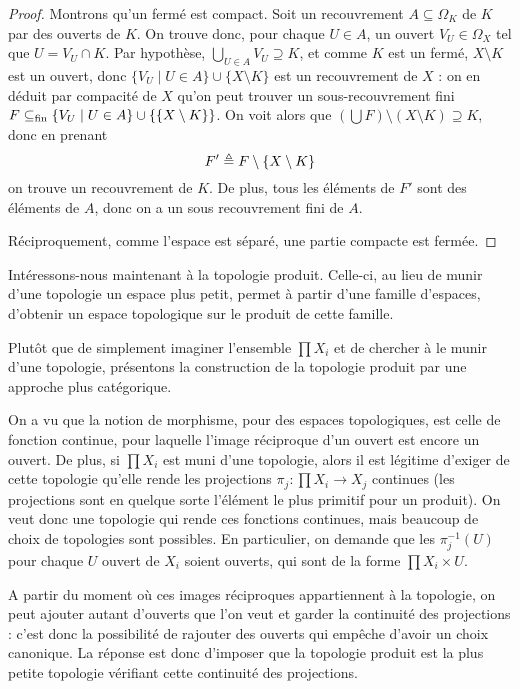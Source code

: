 \begin{proof}
  Montrons qu'un fermé est compact. Soit un recouvrement
  $A\subseteq\Omega_K$ de $K$ par des ouverts de $K$. On trouve donc, pour
  chaque $U\in A$, un ouvert $V_U\in\Omega_X$ tel que $U = V_U\cap K$. Par
  hypothèse, $\displaystyle\bigcup_{U \in A} V_U \supseteq K$, et comme
  $K$ est un fermé, $X\setminus K$ est un ouvert, donc
  $\{V_U\mid U \in A\}\cup\{X\setminus K\}$ est un recouvrement de $X$ :
  on en déduit par compacité de $X$ qu'on peut trouver un sous-recouvrement
  fini $F\subseteq_{\mathrm{fin}} \{V_U\mid U \in A\}\cup\{\{X\setminus K\}\}$. On voit alors
  que $(\bigcup F)\setminus (X\setminus K) \supseteq K$, donc en prenant
  \[F' \triangleq F\setminus\{X\setminus K\}\]
  on trouve un recouvrement de $K$. De plus, tous les éléments de $F'$ sont
  des éléments de $A$, donc on a un sous recouvrement fini de $A$.

  Réciproquement, comme l'espace est séparé, une partie compacte est fermée.
\end{proof}

Intéressons-nous maintenant à la topologie produit. Celle-ci, au lieu de
munir d'une topologie un espace plus petit, permet à partir d'une famille
d'espaces, d'obtenir un espace topologique sur le produit de cette famille.

Plutôt que de simplement imaginer l'ensemble $\prod X_i$ et de chercher à le
munir d'une topologie, présentons la construction de la topologie produit par
une approche plus catégorique.

On a vu que la notion de morphisme, pour des espaces topologiques, est celle de
fonction continue, pour laquelle l'image réciproque d'un ouvert est encore un
ouvert. De plus, si $\prod X_i$ est muni d'une topologie, alors il est légitime
d'exiger de cette topologie qu'elle rende les projections
$\pi_j : \prod X_i \to X_j$ continues (les projections sont en quelque sorte
l'élément le plus primitif pour un produit). On veut donc une topologie qui
rende ces fonctions continues, mais beaucoup de choix de topologies sont
possibles. En particulier, on demande que les $\pi_j^{-1}(U)$ pour chaque
$U$ ouvert de $X_i$ soient ouverts, qui sont de la forme $\prod X_i \times U$.

A partir du moment où ces images réciproques appartiennent à la topologie, on
peut ajouter autant d'ouverts que l'on veut et garder la continuité des
projections : c'est donc la possibilité de rajouter des ouverts qui empêche
d'avoir un choix canonique. La réponse est donc d'imposer que la topologie
produit est la plus petite topologie vérifiant cette continuité des projections.

